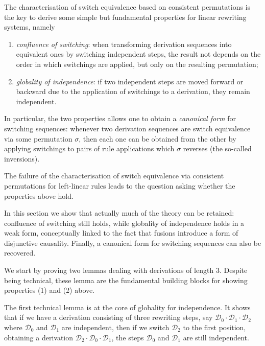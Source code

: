 \documentclass[a4paper,UKenglish,cleveref,pdftex,thm-restate,numberwithinsect,anonymous]{lipics}
\newcommand{\dder}[1]{\mathscr{#1}}
\begin{document}
The characterisation of switch equivalence based on consistent permutations is the key to
derive some simple but fundamental properties for linear rewriting systems, namely
\begin{enumerate}
\item \emph{confluence of switching}: when transforming derivation
  sequences into equivalent ones by switching independent steps, the
  result not depends on the order in which switchings are applied, but
  only on the resulting permutation;
  
\item \emph{globality of independence}: if two independent steps are
  moved forward or backward due to the application of switchings to a
  derivation, they remain independent.
\end{enumerate}


In particular, the two properties allows one to obtain a \emph{canonical form} for switching sequences: whenever two derivation sequences are switch equivalence via some permutation $\sigma$, then each one can be obtained from the other by applying switchings to pairs of rule applications which $\sigma$ reverses (the so-called inversions).

The failure of the characterisation of switch equivalence via
consistent permutations for left-linear rules leads to the
question asking whether the properties above hold.

In this section we show that actually much of the theory can be retained: confluence of switching still holds, while globality of independence holds in a weak form, conceptually linked to the fact that fusions introduce a form of disjunctive causality. Finally, a canonical form for switching sequences can also be recovered.

We start by proving two lemmas dealing with derivations of length
$3$. Despite being technical, these lemma are the fundamental building blocks for showing properties (1) and (2) above.


The first technical lemma is at the core of globality for independence. It shows that if we have a derivation consisting of three rewriting steps, say $\dder{D}_0\cdot \dder{D}_1 \cdot \dder{D}_2$ where $\dder{D}_0$ and $\dder{D}_1$ are independent, then if we switch $\dder{D}_2$ to the first position, 
obtaining a derivation $\dder{D}_2 \cdot  \dder{D}_0\cdot\dder{D}_1$, the steps $\dder{D}_0$ and $\dder{D}_1$ are still independent.
\end{document}

